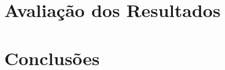 \documentclass[
	12pt,				%
	openright,			%
	oneside,			%
	a4paper,			%
	english,			%
	spanish,			%
	brazil				%
	]{abntex2}
\begin{document}
	\chapter{Avaliação dos Resultados}
	\chapter{Conclusões}
	 
	

\postextual



	
\end{document}
